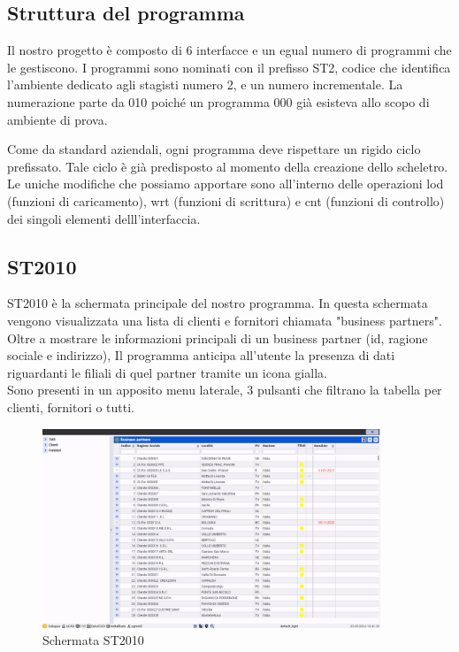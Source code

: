 \documentclass[target=bach,aauheader=,style=]{thud}
\begin{document}
\subsection{Struttura del programma}
Il nostro progetto è composto di 6 interfacce e un egual numero di programmi che le gestiscono.
I programmi sono nominati con il prefisso ST2, codice che identifica l'ambiente dedicato agli stagisti numero 2, e un numero incrementale.
La numerazione parte da 010 poiché un programma 000 già esisteva allo scopo di ambiente di prova.


Come da standard aziendali, ogni programma deve rispettare un rigido ciclo prefissato.
Tale ciclo è già predisposto al momento della creazione dello scheletro.
Le uniche modifiche che possiamo apportare sono all'interno delle operazioni lod (funzioni di caricamento), wrt (funzioni di scrittura) e cnt (funzioni di controllo) dei singoli elementi delll'interfaccia.



\subsection{ST2010}
ST2010 è la schermata principale del nostro programma.
In questa schermata vengono visualizzata una lista di clienti e fornitori chiamata "business partners".
\\Oltre a mostrare le informazioni principali di un business partner (id, ragione sociale e indirizzo), Il programma anticipa all'utente la presenza di dati riguardanti le filiali di quel partner tramite un icona gialla.
\\Sono presenti in un apposito menu laterale, 3 pulsanti che filtrano la tabella per clienti, fornitori o tutti.

\begin{figure}[H]
    \centering
    \includegraphics[width=0.9\textwidth, trim=0cm 0cm 0cm 0cm, clip]{st2/ST2010.png}
    \caption{Schermata ST2010}
\end{figure}
\end{document}

